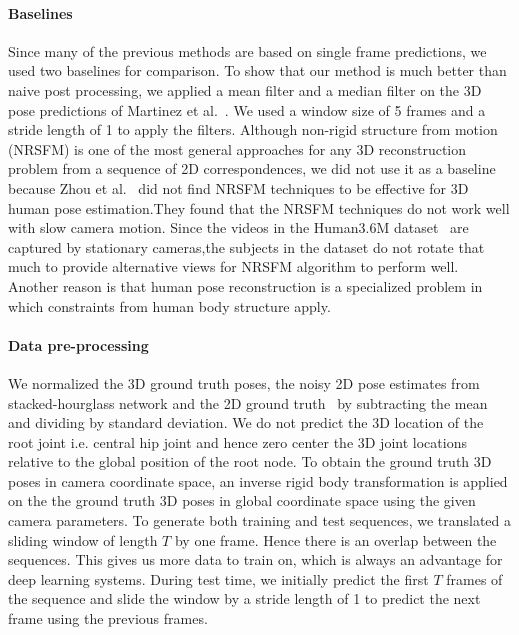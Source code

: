 \documentclass[runningheads]{llncs}
\begin{document}
\paragraph{Baselines} 
Since many of the previous methods are based on single frame predictions, we used two baselines for comparison. To show that our method is much better than naive post processing, we applied a mean filter and a median filter on the 3D pose predictions of Martinez et al.~\cite{JMartinez:ICCV:2017}. We used a window size of 5 frames and a stride length of 1 to apply the filters. Although non-rigid structure from motion (NRSFM) is one of the most general approaches for any 3D reconstruction problem from a sequence of 2D correspondences, we did not use it as a baseline because Zhou et al.~\cite{zhou2016sparseness} did not find NRSFM techniques to be effective for 3D human pose estimation.They found that the NRSFM techniques do not work well with slow camera motion. Since the videos in the Human3.6M dataset~\cite{h36m_pami} are captured by stationary cameras,the subjects in the dataset do not rotate that much to provide alternative views for NRSFM algorithm to perform well. Another reason is that human pose reconstruction is a specialized problem in which constraints from human body structure apply.

\paragraph{Data pre-processing} 
We normalized the 3D ground truth poses, the noisy 2D pose estimates from stacked-hourglass network and the 2D ground truth~\cite{stacked-hourglass} by subtracting the mean and dividing by standard deviation. We do not predict the 3D location of the root joint i.e. central hip joint and hence zero center the 3D joint locations relative to the global position of the root node. To obtain the ground truth 3D poses in camera coordinate space, an inverse rigid body transformation is applied on the the ground truth 3D poses in global coordinate space using the given camera parameters.  
To generate both training and test sequences, we translated a sliding window of length $T$ by one frame. Hence there is an overlap between the sequences. This gives us more data to train on, which is always an advantage for deep learning systems. During test time, we initially predict the first $T$ frames of the sequence and slide the window by a stride length of 1 to predict the next frame using the previous frames.
\end{document}
